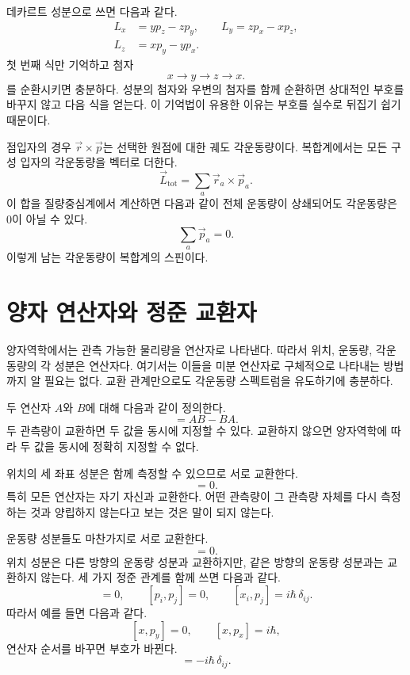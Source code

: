 데카르트 성분으로 쓰면 다음과 같다.\begin{equation}
\begin{aligned}
L_x&=yp_z-zp_y,\qquad
L_y=zp_x-xp_z,\\
L_z&=xp_y-yp_x.
\end{aligned}
\end{equation}첫 번째 식만 기억하고 첨자 \[
x\longrightarrow y\longrightarrow z\longrightarrow x.
\]를 순환시키면 충분하다. 성분의 첨자와 우변의 첨자를 함께 순환하면 상대적인 부호를 바꾸지 않고 다음 식을 얻는다. 이 기억법이 유용한 이유는 부호를 실수로 뒤집기 쉽기 때문이다.

점입자의 경우 \(\vec r\times\vec p\)는 선택한 원점에 대한 궤도 각운동량이다. 복합계에서는 모든 구성 입자의 각운동량을 벡터로 더한다.
\begin{equation}
\vec L_{\mathrm{tot}}=\sum_a \vec r_a\times\vec p_a.
\end{equation}
이 합을 질량중심계에서 계산하면 다음과 같이 전체 운동량이 상쇄되어도 각운동량은 0이 아닐 수 있다.
\[
\sum_a\vec p_a=0.
\]
이렇게 남는 각운동량이 복합계의 스핀이다.

\section{양자 연산자와 정준 교환자}

양자역학에서는 관측 가능한 물리량을 연산자로 나타낸다. 따라서 위치, 운동량, 각운동량의 각 성분은 연산자다. 여기서는 이들을 미분 연산자로 구체적으로 나타내는 방법까지 알 필요는 없다. 교환 관계만으로도 각운동량 스펙트럼을 유도하기에 충분하다.

두 연산자 \(A\)와 \(B\)에 대해 다음과 같이 정의한다.\begin{equation}
[A,B]=AB-BA.
\end{equation}두 관측량이 교환하면 두 값을 동시에 지정할 수 있다. 교환하지 않으면 양자역학에 따라 두 값을 동시에 정확히 지정할 수 없다.

위치의 세 좌표 성분은 함께 측정할 수 있으므로 서로 교환한다.\begin{equation}
[x_i,x_j]=0.
\end{equation}특히 모든 연산자는 자기 자신과 교환한다. 어떤 관측량이 그 관측량 자체를 다시 측정하는 것과 양립하지 않는다고 보는 것은 말이 되지 않는다.

운동량 성분들도 마찬가지로 서로 교환한다.\begin{equation}
[p_i,p_j]=0.
\end{equation}위치 성분은 다른 방향의 운동량 성분과 교환하지만, 같은 방향의 운동량 성분과는 교환하지 않는다. 세 가지 정준 관계를 함께 쓰면 다음과 같다.\begin{equation}
[x_i,x_j]=0,\qquad
[p_i,p_j]=0,\qquad
[x_i,p_j]=i\hbar\,\delta_{ij}.
\end{equation}따라서 예를 들면 다음과 같다.\[
[x,p_y]=0,\qquad [x,p_x]=i\hbar,
\]연산자 순서를 바꾸면 부호가 바뀐다.\begin{equation}
[p_j,x_i]=-i\hbar\,\delta_{ij}.
\end{equation}

